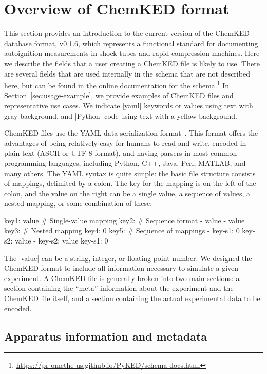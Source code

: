 \documentclass[12pt]{ijck}
\newcommand\ck{ChemKED}
\begin{document}
\section{Overview of ChemKED format}
\label{sec:overview-of-format}

This section provides an introduction to the current version of the \ck{} database format, v0.1.6,
which represents a functional standard for documenting autoignition measurements in shock tubes and
rapid compression machines. Here we describe the fields that a user creating a \ck{} file is likely
to use. There are several fields that are used internally in the schema that are not described here,
but can be found in the online documentation for the
schema.\footnote{\url{https://pr-omethe-us.github.io/PyKED/schema-docs.html}} In
Section~\ref{sec:usage-example}, we provide examples of \ck{} files and representative use cases. We
indicate \yabox|yaml| keywords or values using text with gray background, and \pybox|Python| code
using text with a yellow background.

\ck{} files use the YAML data serialization format~\autocite{yaml:1.2}. This
format offers the advantages of being relatively easy for humans to read and write,
encoded in plain text (ASCII or UTF-8 format), and
having parsers in most common programming languages, including Python, C++, Java,
Perl, MATLAB, and many others. The YAML syntax is quite simple: the basic file
structure consists of mappings, delimited by a colon. The key for the mapping is
on the left of the colon, and the value on the right can be a single value,
a sequence of values, a nested mapping, or some combination of these:
%
\begin{yamlbox}
key1: value  # Single-value mapping
key2:  # Sequence format
  - value
  - value
key3:  # Nested mapping
  key4: 0
key5:  # Sequence of mappings
  - key-s1: 0
    key-s2: value
  - key-s2: value
    key-s1: 0
\end{yamlbox}

The \yabox|value| can be a string, integer, or floating-point number. We designed
the \ck{} format to include all information necessary to simulate a
given experiment. A \ck{} file is generally broken into two main sections: a section containing the
``meta'' information about the experiment and the \ck{} file itself, and a section containing the
actual experimental data to be encoded.

\subsection{Apparatus information and metadata}
\label{sec:apparatus-information-and-metadata}
\end{document}
